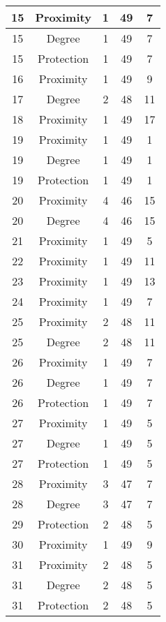 \documentclass[results.tex]{subfiles}
\begin{document}
\begin{center}
\begin{tabular}{| c || c | c | c | c |}
    \hline
    15 & Proximity & 1 & 49 & 7 \\ 
    \hline
    15 & Degree & 1 & 49 & 7 \\ 
    \hline
    15 & Protection & 1 & 49 & 7 \\ 
    \hline
    16 & Proximity & 1 & 49 & 9 \\ 
    \hline
    17 & Degree & 2 & 48 & 11 \\ 
    \hline
    18 & Proximity & 1 & 49 & 17 \\ 
    \hline
    19 & Proximity & 1 & 49 & 1 \\ 
    \hline
    19 & Degree & 1 & 49 & 1 \\ 
    \hline
    19 & Protection & 1 & 49 & 1 \\ 
    \hline
    20 & Proximity & 4 & 46 & 15 \\ 
    \hline
    20 & Degree & 4 & 46 & 15 \\ 
    \hline
    21 & Proximity & 1 & 49 & 5 \\ 
    \hline
    22 & Proximity & 1 & 49 & 11 \\ 
    \hline
    23 & Proximity & 1 & 49 & 13 \\ 
    \hline
    24 & Proximity & 1 & 49 & 7 \\ 
    \hline
    25 & Proximity & 2 & 48 & 11 \\ 
    \hline
    25 & Degree & 2 & 48 & 11 \\ 
    \hline
    26 & Proximity & 1 & 49 & 7 \\ 
    \hline
    26 & Degree & 1 & 49 & 7 \\ 
    \hline
    26 & Protection & 1 & 49 & 7 \\ 
    \hline
    27 & Proximity & 1 & 49 & 5 \\ 
    \hline
    27 & Degree & 1 & 49 & 5 \\ 
    \hline
    27 & Protection & 1 & 49 & 5 \\ 
    \hline
    28 & Proximity & 3 & 47 & 7 \\ 
    \hline
    28 & Degree & 3 & 47 & 7 \\ 
    \hline
    29 & Protection & 2 & 48 & 5 \\ 
    \hline
    30 & Proximity & 1 & 49 & 9 \\ 
    \hline
    31 & Proximity & 2 & 48 & 5 \\ 
    \hline
    31 & Degree & 2 & 48 & 5 \\ 
    \hline
    31 & Protection & 2 & 48 & 5 \\ 
    \hline

\end{tabular}
\end{center}
\end{document}
